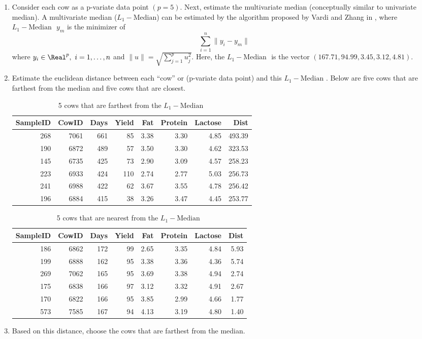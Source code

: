 \begin{enumerate}
\item Consider each cow as a p-variate data point $(p = 5)$. Next, estimate the multivariate median (conceptually similar to univariate median). A multivariate median ($L_1-\text{Median}$) can be estimated by the algorithm proposed by Vardi and Zhang in \cite{Vardi_Zhang_2000_PNAS}, where $L_1-\text{Median }$ $y_m$ is the minimizer of \[ \sum\limits_{i = 1}^n \|y_i - y_m \| \]
where $y_i \in \Real^p, \ i = 1,\dots,n$ and $\|u \| = \sqrt{\sum\limits_{j = 1}^p u_j^2}$. Here, the $L_1-\text{Median }$ is the vector $(167.71, 94.99, 3.45, 3.12, 4.81)$. 
\item Estimate the euclidean distance between each ``cow'' or (p-variate data point) and this $L_1-\text{Median }$. Below are five cows that are farthest from the median and five cows that are closest. 
\begin{table}[H]
\centering
\begin{tabular}{rrrrrrrr}
  \hline
  SampleID & CowID & Days & Yield & Fat & Protein & Lactose & Dist \\ 
  \hline
  268 & 7061 & 661 &  85 & 3.38 & 3.30 & 4.85 & 493.39 \\ 
  190 & 6872 & 489 &  57 & 3.50 & 3.30 & 4.62 & 323.53 \\ 
  145 & 6735 & 425 &  73 & 2.90 & 3.09 & 4.57 & 258.23 \\ 
  223 & 6933 & 424 & 110 & 2.74 & 2.77 & 5.03 & 256.73 \\ 
  241 & 6988 & 422 &  62 & 3.67 & 3.55 & 4.78 & 256.42 \\ 
  196 & 6884 & 415 &  38 & 3.26 & 3.47 & 4.45 & 253.77 \\ 
  \hline
\end{tabular}
\caption{5 cows that are farthest from the $L_1-\text{Median }$}
\label{Tab:farthest}
\end{table}

\begin{table}[H]
\centering
\begin{tabular}{rrrrrrrr}
  \hline
  SampleID & CowID & Days & Yield & Fat & Protein & Lactose & Dist \\ 
  \hline
  186 & 6862 & 172 &  99 & 2.65 & 3.35 & 4.84 & 5.93 \\ 
  199 & 6888 & 162 &  95 & 3.38 & 3.36 & 4.36 & 5.74 \\ 
  269 & 7062 & 165 &  95 & 3.69 & 3.38 & 4.94 & 2.74 \\ 
  175 & 6838 & 166 &  97 & 3.12 & 3.32 & 4.91 & 2.67 \\ 
  170 & 6822 & 166 &  95 & 3.85 & 2.99 & 4.66 & 1.77 \\ 
  573 & 7585 & 167 &  94 & 4.13 & 3.19 & 4.80 & 1.40 \\ 
  \hline
\end{tabular}
\caption{5 cows that are nearest from the $L_1-\text{Median }$}
\label{Tab:closest}
\end{table}

\item Based on this distance, choose the cows that are farthest from the median. 
\end{enumerate}
